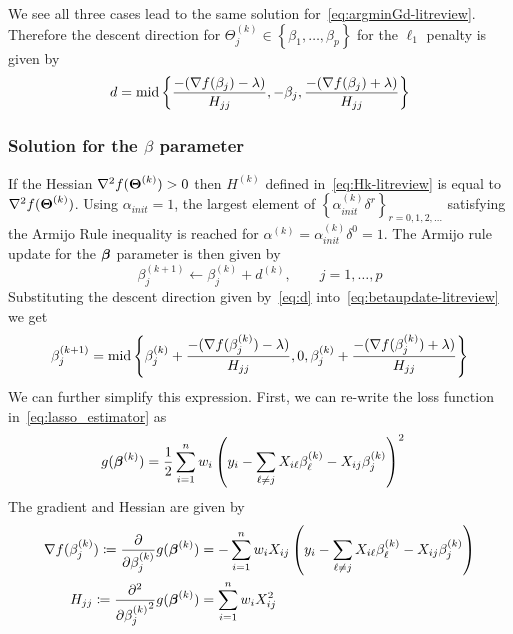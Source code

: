 We see all three cases lead to the same solution for~\eqref{eq:argminGd-litreview}. Therefore the descent direction for $\Theta_j^{(k)} \in \left\lbrace \beta_1, \ldots, \beta_p \right\rbrace$ for the $\ell_1$ penalty is given by
\begin{equation}
d = \textrm{{mid}}\left\lbrace \frac{-(\nabla f(\beta_{j}) - \lambda)}{H_{j j}}, -\beta_j ,\frac{-(\nabla f(\beta_{j}) + \lambda)}{H_{j j}} \right\rbrace  \label{eq:d-litreview}
\end{equation}

\subsubsection{Solution for the $\beta$ parameter} \label{subsec:beta-litreview}
If the Hessian $\nabla^2f(\boldsymbol{\Theta}^{(k)}) >0$ then $H^{(k)}$ defined in~\eqref{eq:Hk-litreview} is equal to $\nabla^2f(\boldsymbol{\Theta}^{(k)})$. Using $\alpha_{init} = 1$, the largest element of $\left\lbrace \alpha_{init}^{(k)} \delta^r \right\rbrace_{r = 0, 1, 2, \ldots}$ satisfying the Armijo Rule inequality is reached for $\alpha^{(k)} = \alpha_{init}^{(k)}\delta^0 = 1$. The Armijo rule update for the $\boldsymbol{\beta}$ parameter is then given by
\begin{equation}
\beta_j^{(k+1)} \leftarrow \beta_j^{(k)} + d^{(k)}, \qquad j=1, \ldots, p \label{eq:betaupdate-litreview}
\end{equation}
Substituting the descent direction given by~\eqref{eq:d} into~\eqref{eq:betaupdate-litreview} we get
\begin{equation}
\beta_j^{(k+1)} = \textrm{{mid}}\left\lbrace \beta_j^{(k)}+ \frac{-(\nabla f(\beta_j^{(k)}) - \lambda)}{H_{j j}}, 0,\beta_j^{(k)}+ \frac{-(\nabla f(\beta_j^{(k)}) + \lambda)}{H_{j j}}  \right\rbrace \label{eq:betaMidpoint-litreview}
\end{equation}
We can further simplify this expression. First, we can re-write the loss function in~\eqref{eq:lasso_estimator} as
\begin{align}
g(\boldsymbol{\beta}^{(k)}) & = \frac{1}{2} \sum_{i=1}^{n} w_i\left(  y_i - \sum_{\ell \neq j}X_{i\ell} \beta_\ell^{(k)} - X_{ij}\beta_j^{(k)} \right) ^2
\end{align}
The gradient and Hessian are given by
\begin{align}
\nabla f(\beta_j^{(k)}) \coloneqq \frac{\partial}{\partial \beta_j^{(k)}}g(\boldsymbol{\beta}^{(k)}) & = - \sum_{i=1}^{n} w_i X_{ij}\left(  y_i - \sum_{\ell \neq j}X_{i\ell} \beta_\ell^{(k)} - X_{ij}\beta_j^{(k)} \right)  \label{eq:grad-litreview}\\
H_{jj} \coloneqq \frac{\partial^2}{\partial {\beta_j^{(k)}}^2}g(\boldsymbol{\beta}^{(k)}) & = \sum_{i=1}^{n} w_i X_{ij}^2  \label{eq:hessian-litreview}
\end{align}
